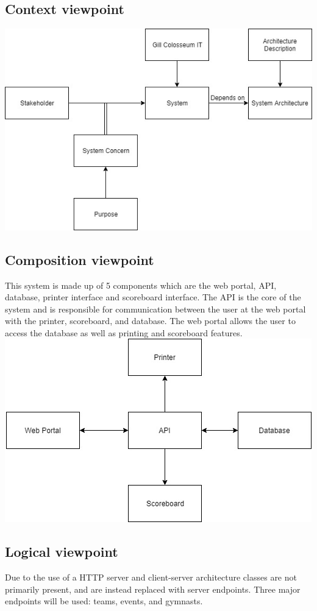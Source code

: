\documentclass[letterpaper,10pt,draftclsnofoot,onecolumn,]{article}
\begin{document}
\subsection{Context viewpoint}
\includegraphics[width=\textwidth,height=\textheight,keepaspectratio]{contextdiagram}
\subsection{Composition viewpoint}
This system is made up of 5 components which are the web portal, API, database, printer interface and scoreboard interface. The API is the core of the system and is responsible for communication between the user at the web portal with the printer, scoreboard, and database. The web portal allows the user to access the database as well as printing and scoreboard features.\\
\includegraphics[width=\textwidth,height=\textheight,keepaspectratio]{compositiondiagram}
\subsection{Logical viewpoint}
Due to the use of a HTTP server and client-server architecture classes are not primarily present, and are instead replaced with server endpoints. Three major endpoints will be used: teams, events, and gymnasts.
\end{document}
